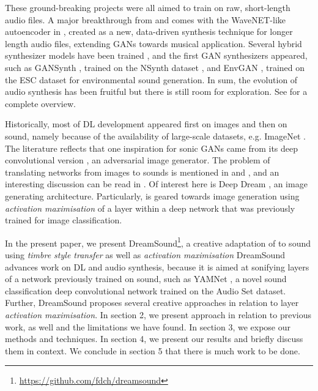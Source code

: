 \documentclass[a4paper,10pt,oneside]{article}
\begin{document}
\begin{sloppy}
These ground-breaking projects were all aimed to train on raw, short-length audio files. A major breakthrough from \cite{oord2016wavenet} and \cite{mehri2017samplernn} comes with the WaveNET-like autoencoder in \cite{engel2017neural}, created as a new, data-driven synthesis technique for longer length audio files, extending GANs towards musical application. Several hybrid synthesizer models have been trained \cite{mccarthy2020hooligan}, and the first GAN synthesizers appeared, such as GANSynth \cite{engel2019gansynth}, trained on the NSynth dataset \cite{engel2017neural}, and EnvGAN \cite{madhu2021envgan}, trained on the ESC dataset \cite{2015piczak} for environmental sound generation. In sum, the evolution of audio synthesis has been fruitful but there is still room for exploration. See \cite{2019Purwins} for a complete overview. 

Historically, most of DL development appeared first on images and then on sound, namely because of the availability of large-scale datasets, e.g. ImageNet \cite{ILSVRC15}. The literature reflects that one inspiration for sonic GANs came from its deep convolutional version \cite{radford2015unsupervised}, an adversarial image generator. The problem of translating networks from images to sounds is mentioned in \cite{RothmanBlog} and \cite{2019Purwins}, and an interesting discussion can be read in \cite{Briot2017}. Of interest here is Deep Dream \cite{Mordvintsev2015}, an image generating architecture. Particularly, \cite{Mordvintsev2015} is geared towards image generation using \textit{activation maximisation} of a layer within a deep network that was previously trained for image classification. 


In the present paper, we present DreamSound\footnote{\url{https://github.com/fdch/dreamsound}}, a creative adaptation of \cite{Mordvintsev2015} to sound using \textit{timbre style transfer} as well as \textit{activation maximisation} DreamSound advances work on DL and audio synthesis, because it is aimed at sonifying layers of a network previously trained on sound, such as YAMNet \cite{YamNet2020}, a novel sound classification deep convolutional network trained on the Audio Set \cite{2017audioset} dataset. Further, DreamSound proposes several creative approaches in relation to layer \textit{activation maximisation}. 
In section 2, we present approach in relation to previous work, as well and the limitations we have found. In section 3, we expose our methods and techniques. In section 4, we present our results and briefly discuss them in context. We conclude in section 5 that there is much work to be done.


\end{sloppy}
\end{document}
